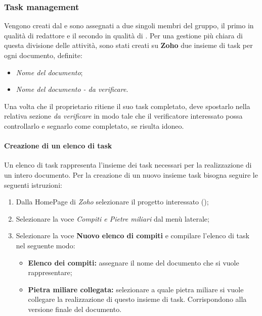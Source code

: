 \subsubsection{Task management}
Vengono creati dal \textsl{\RdP} e sono assegnati a due singoli membri del gruppo, 
il primo in qualità di redattore e il secondo in qualità di \textit{\Ver}.
Per una gestione più chiara di questa divisione delle attività, sono stati creati su \textbf{Zoho} 
due insieme di task per ogni documento, definite:
\begin{itemize}
  \item \textsl{Nome del documento};
  \item \textsl{Nome del documento - da verificare}.
\end{itemize}
Una volta che il proprietario ritiene il suo task completato, deve spostarlo 
nella relativa sezione \textsl{da verificare} in modo tale che il verificatore 
interessato possa controllarlo e segnarlo come completato, se risulta idoneo. 

\paragraph{Creazione di un elenco di task}
Un elenco di task rappresenta l'insieme dei task necessari per la realizzazione di un intero documento.
Per la creazione di un nuovo insieme task bisogna seguire le seguenti istruzioni:
\begin{enumerate}
   \item Dalla HomePage di \textit{Zoho} selezionare il progetto interessato (\progetto);
  \item Selezionare la voce \textsl{Compiti e Pietre miliari} dal menù laterale;
   \item Selezionare la voce \textbf{Nuovo elenco di compiti} e compilare l'elenco di task nel 
  seguente modo:
  \begin{itemize}
    \item \textbf{Elenco dei compiti:} assegnare il nome del documento che si 
    vuole rappresentare;
    \item \textbf{Pietra miliare collegata:} selezionare a quale pietra miliare si 
    vuole collegare la realizzazione di questo insieme di task. Corrispondono alla 
    versione finale del documento.
  \end{itemize}
\end{enumerate}
